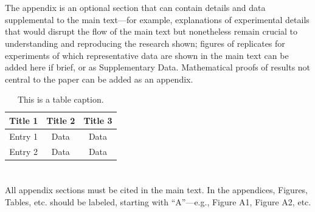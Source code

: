 \documentclass[journal,article,submit,pdftex,moreauthors]{Definitions/mdpi}
\begin{document}
\appendixstart
\appendix
\section[\appendixname~\thesection]{}
\subsection[\appendixname~\thesubsection]{}
The appendix is an optional section that can contain details and data supplemental to the main text---for example, explanations of experimental details that would disrupt the flow of the main text but nonetheless remain crucial to understanding and reproducing the research shown; figures of replicates for experiments of which representative data are shown in the main text can be added here if brief, or as Supplementary Data. Mathematical proofs of results not central to the paper can be added as an appendix.

\begin{table}[H] 
\caption{This is a table caption.\label{tab5}}
\begin{tabularx}{\textwidth}{CCC}
\toprule
\textbf{Title 1}	& \textbf{Title 2}	& \textbf{Title 3}\\
\midrule
Entry 1		& Data			& Data\\
Entry 2		& Data			& Data\\
\bottomrule
\end{tabularx}
\end{table}

\section[\appendixname~\thesection]{}
All appendix sections must be cited in the main text. In the appendices, Figures, Tables, etc. should be labeled, starting with ``A''---e.g., Figure A1, Figure A2, etc.
\end{document}
